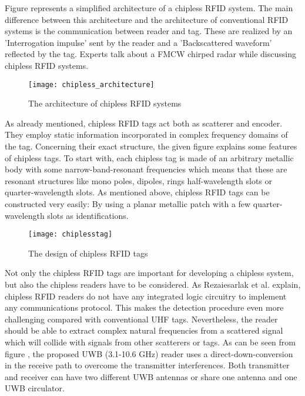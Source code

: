 Figure \pageref{fig:chipless_architecture} represents a simplified architecture of a chipless RFID system. The main difference between this architecture and the architecture of conventional RFID systems is the communication between reader and tag. These are realized by an 'Interrogation impulse' sent by the reader and a 'Backscattered waveform' reflected by the tag. Experts talk about a \ac{FMCW} chirped radar while discussing chipless RFID systems. 

\begin{figure}
\centering
\texttt{[image: chipless\_architecture]}
\caption{\label{fig:chipless_architecture} The architecture of chipless RFID systems \cite[p.17]{chipless}} 
\end{figure}

As already mentioned, chipless RFID tags act both as scatterer and encoder. They employ static information incorporated in complex frequency domains of the tag\cite[p.18 ff.]{chipless}. Concerning their exact structure, the given figure \pageref{fig:chipless_tag} explains some features of chipless tags. To start with, each chipless tag is made of an arbitrary metallic body with some narrow-band-resonant frequencies which means that these are resonant structures like mono poles, dipoles, rings half-wavelength slots or quarter-wavelength slots. 
As mentioned above, chipless RFID tags can be constructed very easily: By using a planar metallic patch with a few quarter-wavelength slots as identifications.

\begin{figure}
\centering
\texttt{[image: chiplesstag]}
\caption{\label{fig:chipless_tag} The design of chipless RFID tags \cite[p.19]{chipless}} 
\end{figure}

Not only the chipless RFID tags are important for developing a chipless system, but also the chipless readers have to be considered. As Rezaiesarlak et al. \cite[p.18 ff.]{chipless} explain, chipless RFID readers do not have any integrated logic circuitry to implement any communications protocol. This makes the detection procedure even more challenging compared with conventional UHF tags. Nevertheless, the reader should be able to extract complex natural frequencies from a scattered signal which will collide with signals from other scatterers or tags. 
As can be seen from figure \pageref{fig:chipless_reader}, the proposed \ac{UWB} (3.1-10.6 GHz) reader uses a direct-down-conversion in the receive path to overcome the transmitter interferences. Both transmitter and receiver can have two different UWB antennas or share one antenna and one UWB circulator.   

